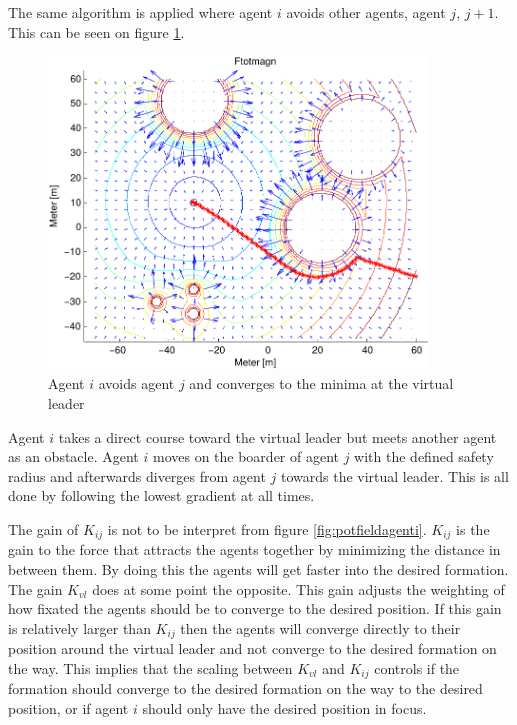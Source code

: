 
The same algorithm is applied where agent $i$ avoids other agents, agent $j$, $j+1$. This can be seen on figure \ref{fig:avoidagent}.
\begin{figure}[htbp]
  \includegraphics[width=0.9\textwidth]{fig/ftotmagnfigpdf}
  \caption{Agent $i$ avoids agent $j$ and converges to the minima at the virtual leader}
  \label{fig:avoidagent}
\end{figure}
Agent $i$ takes a direct course toward the virtual leader but meets
another agent as an obstacle. Agent $i$ moves on the boarder of agent
$j$ with the defined safety radius and afterwards diverges from agent
$j$ towards the virtual leader. This is all done by following the
lowest gradient at all times.

The gain of $K_{ij}$ is not to be interpret from figure
\ref{fig:potfieldagenti}. $K_{ij}$ is the gain to the force that
attracts the agents together by minimizing the distance in between
them. By doing this the agents will get faster into the desired
formation. The gain $K_{vl}$ does at some point the opposite. This
gain adjusts the weighting of how fixated the agents should be to
converge to the desired position. If this gain is relatively larger
than $K_{ij}$ then the agents will converge directly to their position
around the virtual leader and not converge to the desired formation on
the way. This implies that the scaling between $K_{vl}$ and $K_{ij}$
controls if the formation should converge to the desired formation on
the way to the desired position, or if agent $i$ should only have the
desired position in focus.

